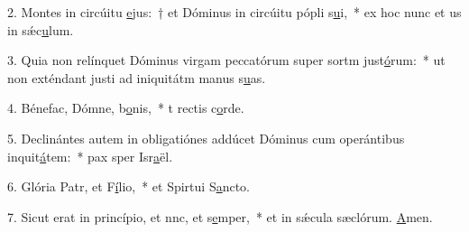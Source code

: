 2. Montes in circúitu \uline{e}jus:~† et Dóminus in circúitu pópli s\uline{u}i,~* ex hoc nunc et us in sǽc\uline{u}lum.\par 
3. Quia non relínquet Dóminus virgam peccatórum super sortm just\uline{ó}rum:~* ut non exténdant justi ad iniquitátm manus s\uline{u}as.\par 
4. Bénefac, Dómne, b\uline{o}nis,~* t rectis c\uline{o}rde.\par 
5. Declinántes autem in obligatiónes addúcet Dóminus cum operántibus inquit\uline{á}tem:~* pax sper Isr\uline{a}ël.\par 
6. Glória Patr, et F\uline{í}lio,~* et Spirtui S\uline{a}ncto.\par 
7. Sicut erat in princípio, et nnc, et s\uline{e}mper,~* et in sǽcula sæclórum. \uline{A}men.\par 
